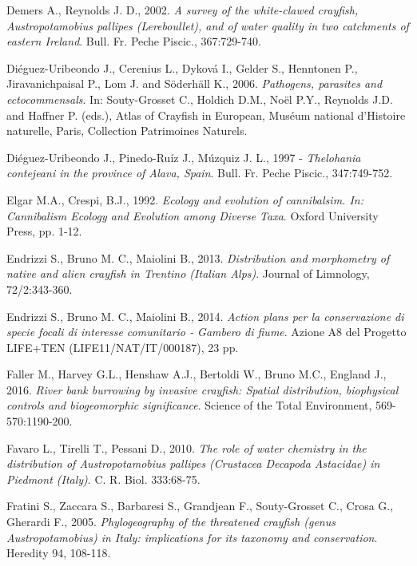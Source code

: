 \documentclass[11pt,a4paper,italian,twoside,openany]{memoir}
\begin{document}
\begin{thebibliography}{9}
 Demers A., Reynolds J. D., 2002. \emph{A survey of the white-clawed crayfish, Austropotamobius pallipes (Lereboullet), and of water quality in two catchments of eastern Ireland}. Bull. Fr. Peche Piscic., 367:729-740.

 Diéguez-Uribeondo J., Cerenius L., Dyková I., Gelder S., Henntonen P., Jiravanichpaisal P., Lom J. and Söderhäll K., 2006. \emph{Pathogens, parasites and ectocommensals}. In: Souty-Grosset C., Holdich D.M., Noël P.Y., Reynolds J.D. and Haffner P. (eds.), Atlas of Crayfish in European, Muséum national d'Histoire naturelle, Paris, Collection Patrimoines Naturels.

 Diéguez-Uribeondo J., Pinedo-Ruíz J., Múzquiz J. L., 1997 - \emph{Thelohania contejeani in the province of Alava, Spain}. Bull. Fr. Peche Piscic., 347:749-752.

 Elgar M.A., Crespi, B.J., 1992. \emph{Ecology and evolution of cannibalsim. In: Cannibalism Ecology and Evolution among Diverse Taxa}. Oxford University Press, pp. 1-12.

 Endrizzi S., Bruno M. C., Maiolini B., 2013. \emph{Distribution and morphometry of native and alien crayfish in Trentino (Italian Alps)}. Journal of Limnology, 72/2:343-360. 

 Endrizzi S., Bruno M. C., Maiolini B., 2014. \emph{Action plans per la conservazione di specie focali di interesse comunitario ‐ Gambero di fiume}. Azione A8 del Progetto LIFE+TEN (LIFE11/NAT/IT/000187), 23 pp.

 Faller M., Harvey G.L., Henshaw A.J., Bertoldi W., Bruno M.C., England J., 2016. \emph{River bank burrowing by invasive crayfish: Spatial distribution, biophysical controls and biogeomorphic significance}. Science of the Total Environment, 569-570:1190-200. 

 Favaro L., Tirelli T., Pessani D., 2010. \emph{The role of water chemistry in the distribution of Austropotamobius pallipes (Crustacea Decapoda Astacidae) in Piedmont (Italy)}. C. R. Biol. 333:68-75.

 Fratini S., Zaccara S., Barbaresi S., Grandjean F., Souty-Grosset C., Crosa G., Gherardi F., 2005. \emph{Phylogeography of the threatened crayfish (genus Austropotamobius) in Italy: implications for its taxonomy and conservation}. Heredity 94, 108-118.


\end{thebibliography}
\end{document}
